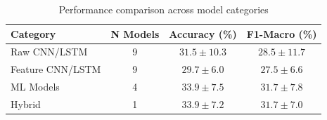 
\begin{table}[htbp]
\centering
\caption{Performance comparison across model categories}
\label{tab:category_comparison}
\begin{tabular}{lccc}
\toprule
\textbf{Category} & \textbf{N Models} & \textbf{Accuracy (\%)} & \textbf{F1-Macro (\%)} \\
\midrule
Raw CNN/LSTM & 9 & $31.5 \pm 10.3$ & $28.5 \pm 11.7$ \\
Feature CNN/LSTM & 9 & $29.7 \pm 6.0$ & $27.5 \pm 6.6$ \\
ML Models & 4 & $33.9 \pm 7.5$ & $31.7 \pm 7.8$ \\
Hybrid & 1 & $33.9 \pm 7.2$ & $31.7 \pm 7.0$ \\
\bottomrule
\end{tabular}
\end{table}
